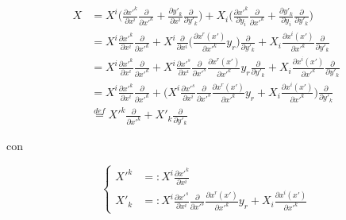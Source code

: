 \begin{equation*}
\begin{aligned}
X &= X^i \bigg( \frac{\partial x'^k}{\partial x^i}\frac{\partial}{\partial x'^k} + \frac{\partial y'_k}{\partial x^i}\frac{\partial}{\partial y'_k} \bigg) + X_i \bigg( \frac{\partial x'^k}{\partial y_i}\frac{\partial}{\partial x'^k} + \frac{\partial y'_k}{\partial y_i}\frac{\partial}{\partial y'_k} \bigg) \\
&= X^i \frac{\partial x'^k}{\partial x^i}\frac{\partial}{\partial x'^k} + X^i \frac{\partial}{\partial x^i} \bigg( \frac{\partial x^r(x')}{\partial x'^k}y_r \bigg) \frac{\partial}{\partial y'_k} + X_i\frac{\partial x^i(x')}{\partial x'^k}\frac{\partial}{\partial y'_k} \\
&= X^i \frac{\partial x'^k}{\partial x^i}\frac{\partial}{\partial x'^k} + X^i \frac{\partial x'^s}{\partial x^i}\frac{\partial}{\partial x'^s} \frac{\partial x^r(x')}{\partial x'^k}y_r\frac{\partial}{\partial y'_k} + X_i\frac{\partial x^i(x')}{\partial x'^k}\frac{\partial}{\partial y'_k} \\
&= X^i \frac{\partial x'^k}{\partial x^i}\frac{\partial}{\partial x'^k} + \bigg( X^i \frac{\partial x'^s}{\partial x^i}\frac{\partial}{\partial x'^s} \frac{\partial x^r(x')}{\partial x'^k}y_r + X_i\frac{\partial x^i(x')}{\partial x'^k} \bigg) \frac{\partial}{\partial y'_k} \\
&\overset{def}{=} X'^k\frac{\partial}{\partial x'^k} + X'_k\frac{\partial}{\partial y'_k}
\end{aligned}
\end{equation*}

con


\begin{equation} \label{eq:strutt_fibr_cot_1}
\left\{
\begin{aligned}
X'^k &=: X^i \frac{\partial x'^k}{\partial x^i} \\
X'_k &=: X^i \frac{\partial x'^s}{\partial x^i}\frac{\partial}{\partial x'^s} \frac{\partial x^r(x')}{\partial x'^k}y_r + X_i\frac{\partial x^i(x')}{\partial x'^k}
\end{aligned}
\right.
\end{equation}

